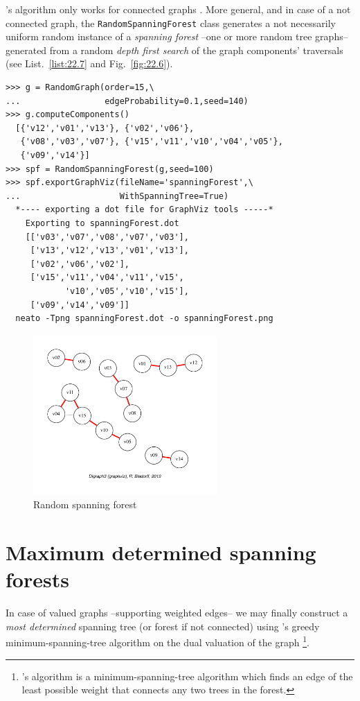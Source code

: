 \Wilson's algorithm only works for connected graphs \citep{WIL-1996}. More general, and in case of a not connected graph, the \texttt{RandomSpanningForest} class generates a not necessarily uniform random instance of a \emph{spanning forest} --one or more random tree graphs-- generated from a random \emph{depth first search} of the graph components' traversals (see List.~\vref{list:22.7} and Fig.~\vref{fig:22.6}).
\begin{lstlisting}[caption={Computing spanning forests over disconnected graphs. },label=list:22.7]
>>> g = RandomGraph(order=15,\
...                 edgeProbability=0.1,seed=140)
>>> g.computeComponents()
  [{'v12','v01','v13'}, {'v02','v06'},
   {'v08','v03','v07'}, {'v15','v11','v10','v04','v05'},
   {'v09','v14'}]
>>> spf = RandomSpanningForest(g,seed=100)
>>> spf.exportGraphViz(fileName='spanningForest',\
...                    WithSpanningTree=True)
  *---- exporting a dot file for GraphViz tools -----*
    Exporting to spanningForest.dot
    [['v03','v07','v08','v07','v03'],
     ['v13','v12','v13','v01','v13'],
     ['v02','v06','v02'],
     ['v15','v11','v04','v11','v15',
            'v10','v05','v10','v15'],
     ['v09','v14','v09']]
  neato -Tpng spanningForest.dot -o spanningForest.png
\end{lstlisting}
\begin{figure}[ht]
\sidecaption[t]
\includegraphics[width=7cm]{Figures/22-6-spanningForest.pdf}
\caption{Random spanning forest} 
\label{fig:22.6}       %
\end{figure}

\section{Maximum determined spanning forests}
\label{sec:22.4}

In case of valued graphs --supporting weighted edges-- we may finally construct a \emph{most determined} spanning tree (or forest if not connected) using \Kruskal's greedy minimum-spanning-tree algorithm on the dual valuation of the graph \citep{KRU-1956}\footnote{\Kruskal's algorithm is a minimum-spanning-tree algorithm which finds an edge of the least possible weight that connects any two trees in the forest.}.

